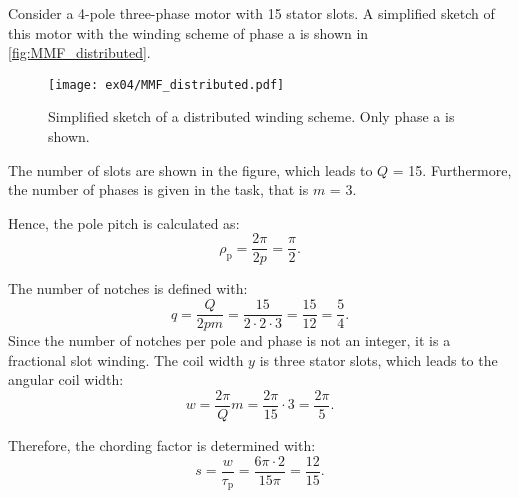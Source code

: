 
Consider a 4-pole three-phase motor with 15 stator slots. A simplified sketch of this motor with the winding scheme of phase a is shown in \autoref{fig:MMF_distributed}.

\begin{figure}[htb]
    \centering
    \texttt{[image: ex04/MMF\_distributed.pdf]}
    \caption{Simplified sketch of a distributed winding scheme. Only phase a is shown.}
    \label{fig:MMF_distributed}
\end{figure}




\begin{solutionblock}
    The number of slots are shown in the figure, which leads to $Q$ = 15. Furthermore, the number of phases is given in the task, that is $m$ = 3.

    Hence, the pole pitch is calculated as:
    \begin{equation}
        \rho_{\mathrm{p}} = \frac{2\pi}{2p}
        = \frac{\pi}{2}.
    \end{equation}
    
    The number of notches is defined with:
    \begin{equation}
        q = \frac{Q}{2pm} = \frac{15}{2\cdot 2 \cdot 3}
        = \frac{15}{12} = \frac{5}{4}.
    \end{equation}
    Since the number of notches per pole and phase is not an integer, it is a fractional slot winding.
    The coil width $y$ is three stator slots, which leads to the angular coil width:
    \begin{equation}
        w = \frac{2\pi}{Q}m
        = \frac{2\pi}{15} \cdot 3
        = \frac{2\pi}{5}.
    \end{equation}

    Therefore, the chording factor is determined with:
    \begin{equation}
        s = \frac{w}{\tau_{\mathrm{p}}}
        = \frac{6\pi \cdot 2}{15 \pi}
        =\frac{12}{15}.
    \end{equation}

\end{solutionblock}

